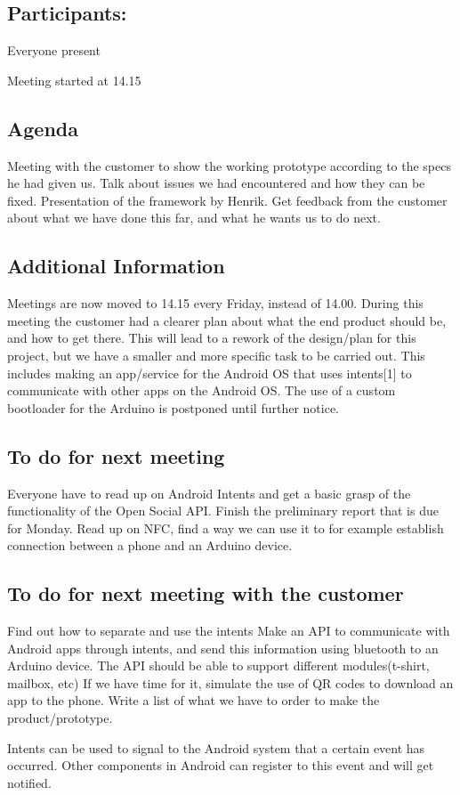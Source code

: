 \subsection{Participants:}
 Everyone present

Meeting started at 14.15


\subsection{Agenda}
Meeting with the customer to show the working prototype according to the specs he had given us.
Talk about issues we had encountered and how they can be fixed.
Presentation of the framework by Henrik.
Get feedback from the customer about what we have done this far, and what he wants us to do next.


\subsection{Additional Information}
Meetings are now moved to 14.15 every Friday, instead of 14.00.
During this meeting the customer had a clearer plan about what the end product should be, and how to get there. This will lead to a rework of the design/plan for this project, but we have a smaller and more specific task to be carried out. This includes making an app/service for the Android OS that uses intents[1] to communicate with other apps on the Android OS.
The use of a custom bootloader for the Arduino is postponed until further notice.


\subsection{To do for next meeting}
Everyone have to read up on Android Intents and get a basic grasp of the functionality of the Open Social API.
Finish the preliminary report that is due for Monday.
Read up on NFC, find a way we can use it to for example establish connection between a phone and an Arduino device.


\subsection{To do for next meeting with the customer}
Find out how to separate and use the intents
Make an API to communicate with Android apps through intents, and send this information using bluetooth to an Arduino device.
The API should be able to support different modules(t-shirt, mailbox, etc)
If we have time for it, simulate the use of QR codes to download an app to the phone.
Write a list of what we have to order to make the product/prototype.

Intents can be used to signal to the Android system that a certain event has occurred. Other components in Android can register to this event and will get notified.
